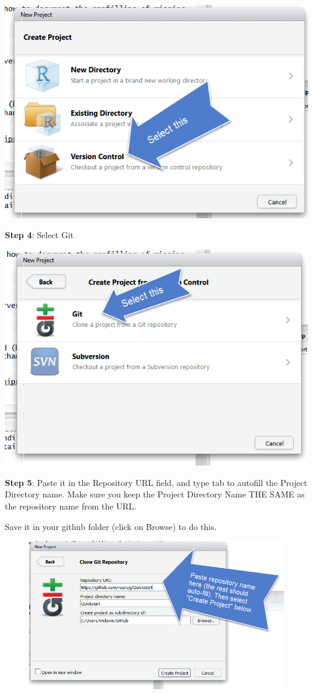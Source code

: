 \documentclass[]{book}
\theoremstyle{definition}
\theoremstyle{definition}
\theoremstyle{definition}
\theoremstyle{remark}
\begin{document}
\includegraphics{img/new_project_2.png}

\textbf{Step 4}: Select Git

\includegraphics{img/new_project_3.png}

\textbf{Step 5}: Paste it in the Repository URL field, and type tab to
autofill the Project Directory name. Make sure you keep the Project
Directory Name THE SAME as the repository name from the URL.

Save it in your github folder (click on Browse) to do this.

\begin{figure}[htbp]
\centering
\includegraphics{img/new_project_4.png}
\caption{}
\end{figure}
\end{document}

